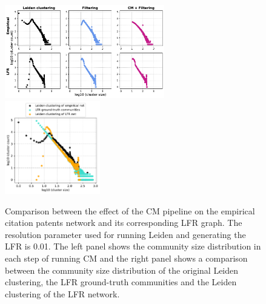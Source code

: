 \documentclass[a4paper]{article}   	%
\begin{document}
\begin{figure}[h!]
\centering
\includegraphics[width=0.62\textwidth]{figs/cit_patents_cm_steps_lfr01.pdf}
\includegraphics[width=0.37\textwidth]{figs/cit_patents_01_cm_size.pdf}
\caption[CM pipeline on the empirical citation patents network and its model LFR graph for r=0.01]{Comparison between the effect of the CM pipeline on the empirical citation patents network and its corresponding LFR graph. The resolution parameter used for running Leiden and generating the LFR is 0.01. The left panel shows the community size distribution in each step of running CM and the right panel shows a comparison between the community size distribution of the original Leiden clustering, the LFR ground-truth communities and the Leiden clustering of the LFR network.}
\label{fig:2cliques}
\end{figure}
\end{document}
